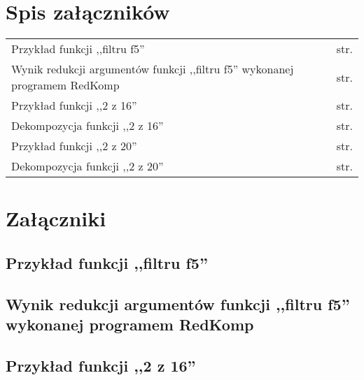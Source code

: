\chapter*{Spis załączników}
\noindent

\begin{tabularx}{\textwidth}{Xl}

Przykład funkcji ,,filtru f5'' & str. \pageref{file:f5.pla} \\
Wynik redukcji argumentów funkcji ,,filtru f5'' wykonanej programem RedKomp & str. \pageref{file:f5.txt} \\

Przykład funkcji ,,2 z 16'' & str. \pageref{file:2outof16.pla} \\
Dekompozycja funkcji ,,2 z 16'' & str. \pageref{file:2outof16.txt} \\

Przykład funkcji ,,2 z 20'' & str. \pageref{file:2outof20.pla} \\
Dekompozycja funkcji ,,2 z 20'' & str. \pageref{file:2outof20.txt} \\
\end{tabularx}

\chapter*{Załączniki}
\section*{Przykład funkcji ,,filtru f5''}
\label{file:f5.pla}

\clearpage
\section*{Wynik redukcji argumentów funkcji ,,filtru f5'' wykonanej programem RedKomp}
\label{file:f5.txt}

\clearpage

\section*{Przykład funkcji ,,2 z 16''}
\label{file:2outof16.pla}

\clearpage

